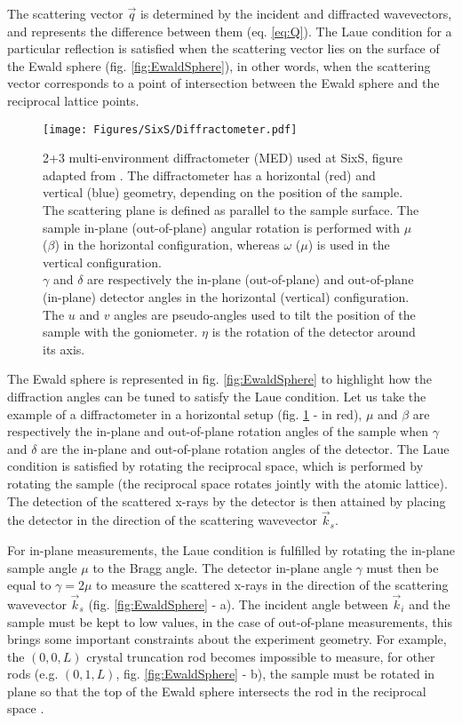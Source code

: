 The scattering vector $\vec{q}$ is determined by the incident and diffracted wavevectors, and represents the difference between them (eq. \ref{eq:Q}).
The Laue condition for a particular reflection is satisfied when the scattering vector lies on the surface of the Ewald sphere (fig. \ref{fig:EwaldSphere}), in other words, when the scattering vector corresponds to a point of intersection between the Ewald sphere and the reciprocal lattice points.

\begin{figure}[!htb]
    \centering
    \texttt{[image: Figures/SixS/Diffractometer.pdf]}
    \caption{
    2+3 multi-environment diffractometer (MED) used at SixS, figure adapted from \cite{Schleputz2011}.
    The diffractometer has a horizontal (red) and vertical (blue) geometry, depending on the position of the sample.\\
    The scattering plane is defined as parallel to the sample surface.
    The sample in-plane (out-of-plane) angular rotation is performed with $\mu$ ($\beta$) in the horizontal configuration, whereas $\omega$ ($\mu$) is used in the vertical configuration.\\
    $\gamma$ and $\delta$ are respectively the in-plane (out-of-plane) and out-of-plane (in-plane) detector angles in the horizontal (vertical) configuration.\\
    The $u$ and $v$ angles are pseudo-angles used to tilt the position of the sample with the goniometer.
    $\eta$ is the rotation of the detector around its axis.
    }
    \label{fig:Diffractometer}
\end{figure}

The Ewald sphere is represented in fig. \ref{fig:EwaldSphere} to highlight how the diffraction angles can be tuned to satisfy the Laue condition.
Let us take the example of a diffractometer in a horizontal setup (fig. \ref{fig:Diffractometer} - in red), $\mu$ and $\beta$ are respectively the in-plane and out-of-plane rotation angles of the sample when $\gamma$ and $\delta$ are the in-plane and out-of-plane rotation angles of the detector.
The Laue condition is satisfied by rotating the reciprocal space, which is performed by rotating the sample (the reciprocal space rotates jointly with the atomic lattice).
The detection of the scattered x-rays by the detector is then attained by placing the detector in the direction of the scattering wavevector $\vec{k}_s$.

For in-plane measurements, the Laue condition is fulfilled by rotating the in-plane sample angle $\mu$ to the Bragg angle.
The detector in-plane angle $\gamma$ must then be equal to $\gamma = 2 \mu$ to measure the scattered x-rays in the direction of the scattering wavevector $\vec{k}_s$ (fig. \ref{fig:EwaldSphere} - a).
The incident angle between $\vec{k}_i$ and the sample must be kept to low values, in the case of out-of-plane measurements, this brings some important constraints about the experiment geometry.
For example, the $(0, 0, L)$ crystal truncation rod becomes impossible to measure, for other rods (e.g. $(0, 1, L)$, fig. \ref{fig:EwaldSphere} - b), the sample must be rotated in plane so that the top of the Ewald sphere intersects the rod in the reciprocal space \parencite{Vlieg1997, Schleputz2005}.

